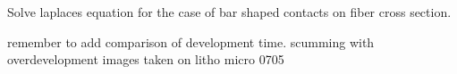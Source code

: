 Solve laplaces equation for the case of bar shaped contacts on fiber cross section. 

remember to add comparison of development time. scumming with overdevelopment images taken on litho micro 0705